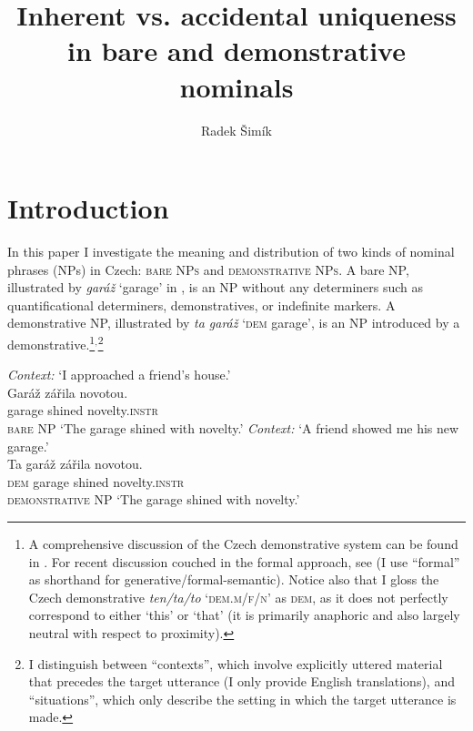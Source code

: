 \documentclass[output=paper,colorlinks,citecolor=brown,newtxmath]{langscibook}
\author{Radek Šimík\affiliation{Charles University in Prague}\orcid{0000-0002-4736-195X}}
\title{Inherent vs. accidental uniqueness in bare and demonstrative nominals}
\begin{document}
\maketitle



\section{Introduction}\label{simik:sec:intro}

In this paper I investigate the meaning and distribution of two kinds of nominal phrases (NPs) in Czech: \textsc{bare NPs} and \textsc{demonstrative NPs}. A bare NP, illustrated by \textit{garáž} `garage' in , is an NP without any determiners such as quantificational determiners, demonstratives, or indefinite markers. A demonstrative NP, illustrated by \textit{ta garáž} `\textsc{dem} garage', is an NP introduced by a demonstrative.\footnote{A comprehensive discussion of the Czech demonstrative system can be found in \citet{Berger1993}. For recent discussion couched in the formal approach, see \citet{Simik2016} (I use ``formal'' as shorthand for generative/formal-semantic). Notice also that I gloss the Czech demonstrative \textit{ten/ta/to} `\textsc{dem.m/f/n}' as \textsc{dem}, as it does not perfectly correspond to either `this' or `that' (it is primarily anaphoric and also largely neutral with respect to proximity).}$^,$\footnote{I distinguish between ``contexts'', which involve explicitly uttered material that precedes the target utterance (I only provide English translations), and ``situations'', which only describe the setting in which the target utterance is made.}

\ea \label{simik:ex:bare-dem}
\ea\textit{Context:} `I approached a friend's house.'\label{simik:ex:bare-dem-a}\\
\gll Garáž zářila novotou.\\
garage shined novelty.\textsc{instr}\\\hfill\textsc{bare NP}
\glt `The garage shined with novelty.'
\ex \textit{Context:} `A friend showed me his new garage.'\\
\label{simik:ex:bare-dem-b}\gll Ta garáž zářila novotou.\\
\textsc{dem} garage shined novelty.\textsc{instr}\\\hfill\textsc{demonstrative NP}
\glt `The garage shined with novelty.'
\z\z
\end{document}
